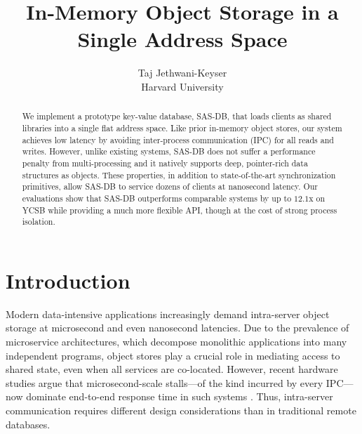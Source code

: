 

\date{}

\title{\Large \bf In-Memory Object Storage in a Single Address Space}

\author{
	{\rm Taj Jethwani-Keyser}\\
	Harvard University
} %

\maketitle

\begin{abstract}
    We implement a prototype key-value database, SAS-DB, that loads clients as
    shared libraries into a single flat address space. Like prior in-memory
    object stores, our system achieves low latency by avoiding inter-process
    communication (IPC) for all reads and writes. However, unlike existing
    systems, SAS-DB does not suffer a performance penalty from multi-processing
    and it natively supports deep, pointer-rich data structures as objects.
    These properties, in addition to state-of-the-art synchronization
    primitives, allow SAS-DB to service dozens of clients at nanosecond latency.
    Our evaluations show that SAS-DB outperforms comparable systems by up to
    $12.1$x on YCSB while providing a much more flexible API, though at the cost
    of strong process isolation.
\end{abstract}


\section{Introduction}
\label{sec:intro}

Modern data-intensive applications increasingly demand intra-server object
storage at microsecond and even nanosecond latencies. Due to the prevalence of
microservice architectures, which decompose monolithic applications into many
independent programs, object stores play a crucial role in mediating access to
shared state, even when all services are co-located. However, recent hardware
studies argue that microsecond-scale stalls---of the kind incurred by every
IPC---now dominate end-to-end response time in such systems
\cite{barroso17killer, gan19deathstar, lightning22}. Thus, intra-server
communication requires different design considerations than in traditional
remote databases.

